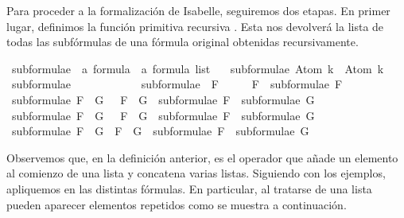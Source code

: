 \begin{isabellebody}
\begin{isamarkuptext}
  Para proceder a la formalización de Isabelle, seguiremos dos etapas. 
  En primer lugar, definimos la función primitiva recursiva 
  . Esta nos devolverá la lista de todas las 
  subfórmulas de una fórmula original obtenidas recursivamente.%
\end{isamarkuptext}\isamarkuptrue%
\isamarkupfalse%
\ subformulae\ {\isacharcolon}{\isacharcolon}\ {\isachardoublequoteopen}{\isacharprime}a\ formula\ {\isasymRightarrow}\ {\isacharprime}a\ formula\ list{\isachardoublequoteclose}\ \isanewline
\ \ {\isachardoublequoteopen}subformulae\ {\isacharparenleft}Atom\ k{\isacharparenright}\ {\isacharequal}\ {\isacharbrackleft}Atom\ k{\isacharbrackright}{\isachardoublequoteclose}\ \isanewline
{\isacharbar}\ {\isachardoublequoteopen}subformulae\ {\isasymbottom}\ \ \ \ \ \ \ \ {\isacharequal}\ {\isacharbrackleft}{\isasymbottom}{\isacharbrackright}{\isachardoublequoteclose}\ \isanewline
{\isacharbar}\ {\isachardoublequoteopen}subformulae\ {\isacharparenleft}\isactrlbold {\isasymnot}\ F{\isacharparenright}\ \ \ \ {\isacharequal}\ {\isacharparenleft}\isactrlbold {\isasymnot}\ F{\isacharparenright}\ {\isacharhash}\ subformulae\ F{\isachardoublequoteclose}\ \isanewline
{\isacharbar}\ {\isachardoublequoteopen}subformulae\ {\isacharparenleft}F\ \isactrlbold {\isasymand}\ G{\isacharparenright}\ \ {\isacharequal}\ {\isacharparenleft}F\ \isactrlbold {\isasymand}\ G{\isacharparenright}\ {\isacharhash}\ subformulae\ F\ {\isacharat}\ subformulae\ G{\isachardoublequoteclose}\ \isanewline
{\isacharbar}\ {\isachardoublequoteopen}subformulae\ {\isacharparenleft}F\ \isactrlbold {\isasymor}\ G{\isacharparenright}\ \ {\isacharequal}\ {\isacharparenleft}F\ \isactrlbold {\isasymor}\ G{\isacharparenright}\ {\isacharhash}\ subformulae\ F\ {\isacharat}\ subformulae\ G{\isachardoublequoteclose}\isanewline
{\isacharbar}\ {\isachardoublequoteopen}subformulae\ {\isacharparenleft}F\ \isactrlbold {\isasymrightarrow}\ G{\isacharparenright}\ {\isacharequal}\ {\isacharparenleft}F\ \isactrlbold {\isasymrightarrow}\ G{\isacharparenright}\ {\isacharhash}\ subformulae\ F\ {\isacharat}\ subformulae\ G{\isachardoublequoteclose}%
\begin{isamarkuptext}%
Observemos que, en la definición anterior, \isa{{\isacharhash}} es el operador que 
  añade un elemento al comienzo de una lista y \isa{{\isacharat}} concatena varias 
  listas. Siguiendo con los ejemplos, apliquemos  en 
  las distintas fórmulas. En particular, al tratarse de una lista pueden 
  aparecer elementos repetidos como se muestra a continuación.%

\end{isamarkuptext}
\end{isabellebody}

